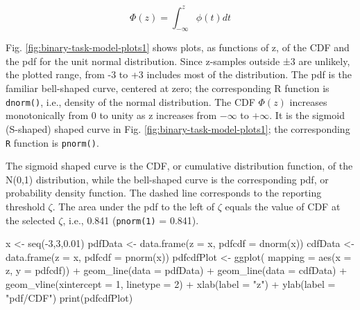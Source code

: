 \documentclass[
]{book}
\newenvironment{Shaded}{\begin{snugshade}}{\end{snugshade}}
\newcommand{\AttributeTok}[1]{\textcolor[rgb]{0.77,0.63,0.00}{#1}}
\newcommand{\DecValTok}[1]{\textcolor[rgb]{0.00,0.00,0.81}{#1}}
\newcommand{\FloatTok}[1]{\textcolor[rgb]{0.00,0.00,0.81}{#1}}
\newcommand{\FunctionTok}[1]{\textcolor[rgb]{0.00,0.00,0.00}{#1}}
\newcommand{\NormalTok}[1]{#1}
\newcommand{\OtherTok}[1]{\textcolor[rgb]{0.56,0.35,0.01}{#1}}
\newcommand{\SpecialCharTok}[1]{\textcolor[rgb]{0.00,0.00,0.00}{#1}}
\newcommand{\StringTok}[1]{\textcolor[rgb]{0.31,0.60,0.02}{#1}}
\begin{document}
\begin{equation} 
\Phi\left ( z \right )=\int_{-\infty }^{z}\phi(t)dt
\label{eq:binary-task-model-Phi}
\end{equation}

Fig. \ref{fig:binary-task-model-plots1} shows plots, as functions of z, of the CDF and the pdf for the unit normal distribution. Since z-samples outside ±3 are unlikely, the plotted range, from -3 to +3 includes most of the distribution. The pdf is the familiar bell-shaped curve, centered at zero; the corresponding R function is \texttt{dnorm()}, i.e., density of the normal distribution. The CDF \(\Phi(z)\) increases monotonically from 0 to unity as z increases from \(-\infty\) to \(+\infty\). It is the sigmoid (S-shaped) shaped curve in Fig. \ref{fig:binary-task-model-plots1}; the corresponding \texttt{R} function is \texttt{pnorm()}.

The sigmoid shaped curve is the CDF, or cumulative distribution function, of the N(0,1) distribution, while the bell-shaped curve is the corresponding pdf, or probability density function. The dashed line corresponds to the reporting threshold \(\zeta\). The area under the pdf to the left of \(\zeta\) equals the value of CDF at the selected \(\zeta\), i.e., 0.841 (\texttt{pnorm(1)} = 0.841).

\begin{Shaded}
\begin{Highlighting}[]
\NormalTok{x }\OtherTok{\textless{}{-}} \FunctionTok{seq}\NormalTok{(}\SpecialCharTok{{-}}\DecValTok{3}\NormalTok{,}\DecValTok{3}\NormalTok{,}\FloatTok{0.01}\NormalTok{)}
\NormalTok{pdfData }\OtherTok{\textless{}{-}} \FunctionTok{data.frame}\NormalTok{(}\AttributeTok{z =}\NormalTok{ x, }\AttributeTok{pdfcdf =} \FunctionTok{dnorm}\NormalTok{(x))}
\NormalTok{cdfData }\OtherTok{\textless{}{-}} \FunctionTok{data.frame}\NormalTok{(}\AttributeTok{z =}\NormalTok{ x, }\AttributeTok{pdfcdf =} \FunctionTok{pnorm}\NormalTok{(x))}
\NormalTok{pdfcdfPlot }\OtherTok{\textless{}{-}} \FunctionTok{ggplot}\NormalTok{(}
  \AttributeTok{mapping =} \FunctionTok{aes}\NormalTok{(}\AttributeTok{x =}\NormalTok{ z, }\AttributeTok{y =}\NormalTok{ pdfcdf)) }\SpecialCharTok{+} 
  \FunctionTok{geom\_line}\NormalTok{(}\AttributeTok{data =}\NormalTok{ pdfData) }\SpecialCharTok{+} 
  \FunctionTok{geom\_line}\NormalTok{(}\AttributeTok{data =}\NormalTok{ cdfData) }\SpecialCharTok{+}
  \FunctionTok{geom\_vline}\NormalTok{(}\AttributeTok{xintercept =} \DecValTok{1}\NormalTok{, }\AttributeTok{linetype =} \DecValTok{2}\NormalTok{) }\SpecialCharTok{+} 
  \FunctionTok{xlab}\NormalTok{(}\AttributeTok{label =} \StringTok{"z"}\NormalTok{) }\SpecialCharTok{+} \FunctionTok{ylab}\NormalTok{(}\AttributeTok{label =} \StringTok{"pdf/CDF"}\NormalTok{)}
\FunctionTok{print}\NormalTok{(pdfcdfPlot)}
\end{Highlighting}
\end{Shaded}
\end{document}
